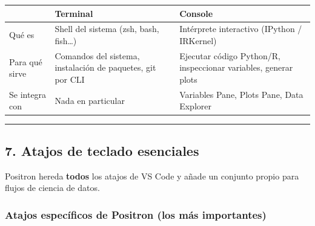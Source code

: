 \documentclass[
  doc,
  floatsintext,
  longtable,
  a4paper,
  nolmodern,
  notxfonts,
  notimes,
  12pt,
  colorlinks=true,linkcolor=blue,citecolor=blue,urlcolor=blue]{apa7}
\newcounter{none} %
\begin{document}
{\def\LTcaptype{none} %
\begin{longtable}[]{@{}
  >{\raggedright\arraybackslash}p{}
  >{\raggedright\arraybackslash}p{}
  >{\raggedright\arraybackslash}p{}@{}}
\toprule\noalign{}
\begin{minipage}[b]{\linewidth}\raggedright
\end{minipage} & \begin{minipage}[b]{\linewidth}\raggedright
\textbf{Terminal}
\end{minipage} & \begin{minipage}[b]{\linewidth}\raggedright
\textbf{Console}
\end{minipage} \\
\midrule\noalign{}
\endhead
\bottomrule\noalign{}
\endlastfoot
Qué es & Shell del sistema (zsh, bash, fish\ldots) & Intérprete
interactivo (IPython / IRKernel) \\
Para qué sirve & Comandos del sistema, instalación de paquetes, git por
CLI & Ejecutar código Python/R, inspeccionar variables, generar plots \\
Se integra con & Nada en particular & Variables Pane, Plots Pane, Data
Explorer \\
\end{longtable}
}

\begin{center}\rule{0.5\linewidth}{0.5pt}\end{center}

\subsection{7. Atajos de teclado
esenciales}\label{atajos-de-teclado-esenciales}

Positron hereda \textbf{todos} los atajos de VS Code y añade un conjunto
propio para flujos de ciencia de datos.

\subsubsection{Atajos específicos de Positron (los más
importantes)}\label{atajos-especuxedficos-de-positron-los-muxe1s-importantes}
\end{document}
